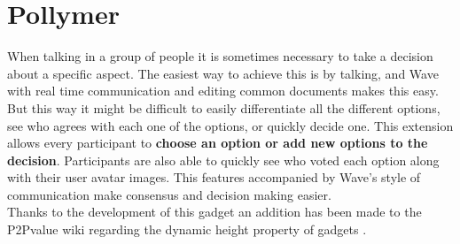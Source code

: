 \thispagestyle{sectioned}
\chapter{Pollymer}
\label{subsec:decision_intro}
When talking in a group of people it is sometimes necessary to take a decision about a specific aspect. The easiest way to achieve this is by talking, and Wave with real time communication and editing common documents makes this easy. But this way it might be difficult to easily differentiate all the different options, see who agrees with each one of the options, or quickly decide one. This extension allows every participant to \textbf{choose an option or add new options to the decision}. Participants are also able to quickly see who voted each option along with their user avatar images. This features accompanied by Wave's style of communication make consensus and decision making easier.\\[.2cm]
Thanks to the development of this gadget an addition has been made to the P2Pvalue wiki regarding the dynamic height property of gadgets \cite{ref:gadget_development}.

